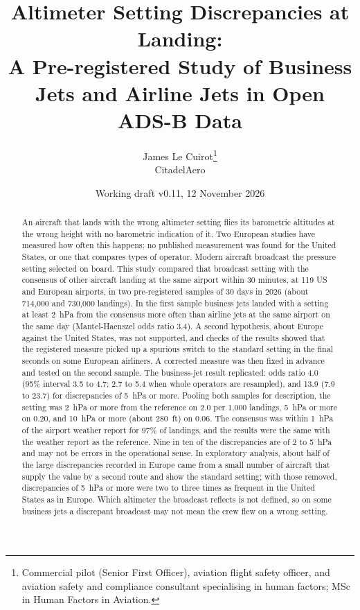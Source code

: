 \documentclass[11pt]{article}
\title{Altimeter Setting Discrepancies at Landing:\texorpdfstring{\\}{} A Pre-registered Study of Business Jets and Airline Jets in Open ADS-B Data}
\author{James Le Cuirot\thanks{Commercial pilot (Senior First Officer), aviation flight safety officer, and aviation safety and compliance consultant specialising in human factors; MSc in Human Factors in Aviation.}\\[2pt] \normalsize CitadelAero}
\date{Working draft v0.11, 12 November 2026}
\begin{document}
\setlength{\emergencystretch}{1.5em}
\maketitle

\begin{abstract}
An aircraft that lands with the wrong altimeter setting flies its barometric altitudes at the wrong height with no barometric indication of it. Two European studies have measured how often this happens; no published measurement was found for the United States, or one that compares types of operator. Modern aircraft broadcast the pressure setting selected on board. This study compared that broadcast setting with the consensus of other aircraft landing at the same airport within 30 minutes, at 119 US and European airports, in two pre-registered samples of 30 days in 2026 (about 714{,}000 and 730{,}000 landings). In the first sample business jets landed with a setting at least 2~hPa from the consensus more often than airline jets at the same airport on the same day (Mantel-Haenszel odds ratio 3.4). A second hypothesis, about Europe against the United States, was not supported, and checks of the results showed that the registered measure picked up a spurious switch to the standard setting in the final seconds on some European airliners. A corrected measure was then fixed in advance and tested on the second sample. The business-jet result replicated: odds ratio 4.0 (95\% interval 3.5 to 4.7; 2.7 to 5.4 when whole operators are resampled), and 13.9 (7.9 to 23.7) for discrepancies of 5~hPa or more. Pooling both samples for description, the setting was 2~hPa or more from the reference on 2.0 per 1{,}000 landings, 5~hPa or more on 0.20, and 10~hPa or more (about 280~ft) on 0.06. The consensus was within 1~hPa of the airport weather report for 97\% of landings, and the results were the same with the weather report as the reference. Nine in ten of the discrepancies are of 2 to 5~hPa and may not be errors in the operational sense. In exploratory analysis, about half of the large discrepancies recorded in Europe came from a small number of aircraft that supply the value by a second route and show the standard setting; with those removed, discrepancies of 5~hPa or more were two to three times as frequent in the United States as in Europe. Which altimeter the broadcast reflects is not defined, so on some business jets a discrepant broadcast may not mean the crew flew on a wrong setting.
\end{abstract}
\end{document}
